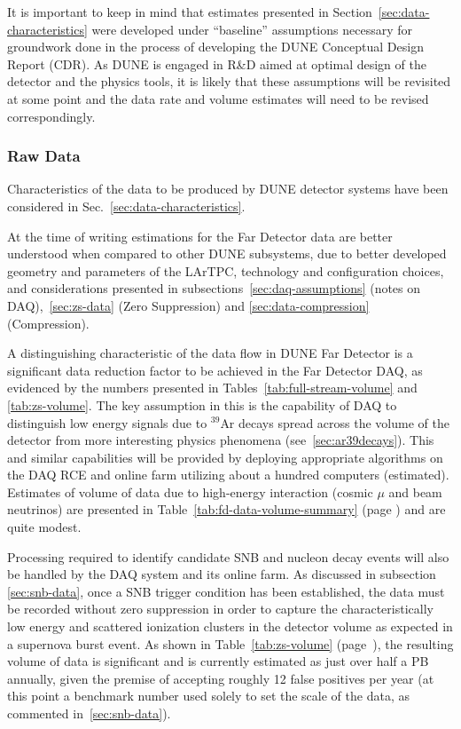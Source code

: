 It is important to keep in mind that estimates presented in Section~\ref{sec:data-characteristics} were developed under ``baseline''
assumptions necessary for groundwork done in the process of developing the DUNE Conceptual Design Report (CDR).
As DUNE is engaged in R\&D aimed at optimal design of the detector and the physics tools, it is likely that these assumptions will be
revisited at some point and the data rate and volume estimates will need to be revised correspondingly.

\subsubsection{Raw Data}
Characteristics of the data to be produced by DUNE detector systems have been considered in
Sec.~\ref{sec:data-characteristics}.

At the time of writing estimations for the Far Detector data are better understood when compared to other DUNE subsystems,
due to better developed geometry and parameters of the LArTPC, technology and configuration choices, and considerations
presented in subsections~\ref{sec:daq-assumptions} (notes on DAQ),~\ref{sec:zs-data} (Zero Suppression) and \ref{sec:data-compression} (Compression).

A distinguishing characteristic of the data flow in DUNE Far Detector is a significant data reduction factor to be achieved
in the Far Detector DAQ, as evidenced by the numbers presented in Tables~\ref{tab:full-stream-volume} and \ref{tab:zs-volume}.
The key assumption in this is the capability of DAQ to distinguish low energy signals  due to $^{39}$Ar decays spread
across the volume of the detector from more interesting physics phenomena (see~\ref{sec:ar39decays}).
This and similar capabilities will be provided
by deploying appropriate algorithms on the DAQ RCE and online farm utilizing about a hundred computers (estimated).
Estimates of volume of data due to high-energy interaction (cosmic $\mu$ and beam neutrinos) are presented in
Table~\ref{tab:fd-data-volume-summary} (page \pageref{tab:fd-data-volume-summary}) and are quite modest.

Processing required to identify candidate SNB and nucleon decay events will also be handled by the DAQ system and its online farm.
As discussed in subsection \ref{sec:snb-data}, once a SNB trigger condition has been established, the data must
be recorded without zero suppression in order to capture the characteristically low energy and scattered ionization
clusters in the detector volume as expected in a supernova burst event. As shown in Table~\ref{tab:zs-volume} (page~\pageref{tab:zs-volume}),
the resulting volume of data is significant and is currently estimated as just over half a PB annually, given the premise of accepting roughly
12 false positives per year (at this point a benchmark number used solely to set the scale of the data, as commented in~\ref{sec:snb-data}).

